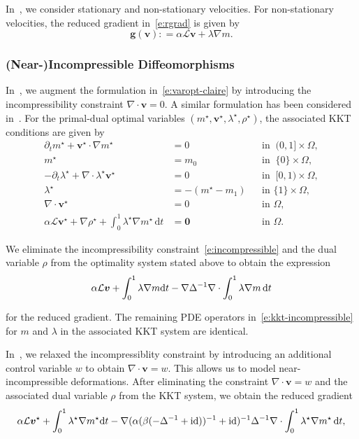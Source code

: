 \documentclass[11pt]{amsart}
\newcommand\op[1]{\ensuremath{\mathcal{#1}}}
\newcommand\igrad{\ensuremath{\nabla}}
\newcommand{\idiv}{\ensuremath{\nabla\cdot}}
\newcommand{\ilap}{\rotatebox[origin=c]{180}{$\nabla$}}
\newcommand{\defeq}{\ensuremath{\mathrel{\mathop:}=}}
\renewcommand{\d}{\ensuremath{\text{d}}}
\renewcommand{\vec}[1]{\ensuremath{\boldsymbol{#1}}}
\begin{document}
In~\cite{Mang:2015a}, we consider stationary and non-stationary velocities. For non-stationary velocities, the reduced gradient in~\eqref{e:rgrad} is given by
\[
\vec{g}(\vec{v}) \defeq
\alpha \op{L} \vec{v} + \lambda \igrad m.
\]




\subsubsection*{(Near-)Incompressible Diffeomorphisms}

In~\cite{Mang:2015a}, we augment the formulation in~\eqref{e:varopt-claire} by introducing the incompressibility constraint $\idiv \vec{v} = 0$. A similar formulation has been considered in~\cite{Chen:2012a}. For the primal-dual optimal variables $(m^\star, \vec{v}^\star, \lambda^\star, \rho^\star)$, the associated KKT conditions are given by
\begin{subequations}\label{e:kkt-incompressible}
\begin{align}
\partial_t m^\star + \vec{v}^\star \cdot \igrad m^\star & = 0
&& \text{in}\;\; (0,1] \times \Omega,
\\
m^\star &= m_0
&& \text{in}\;\; \{0\} \times \Omega,
\\
-\partial_t \lambda^\star + \idiv \lambda^\star\vec{v}^\star  & = 0
&& \text{in}\;\; [0,1) \times \Omega,
\\
\lambda^\star &=  -(m^\star - m_1)
&& \text{in}\,\,\{1\} \times \Omega,
\\
\idiv \vec{v}^\star &= 0
&& \text{in}\,\,\Omega,\label{e:incompressible}
\\
\alpha \op{L} \vec{v}^\star + \igrad  \rho^\star + \int_0^1\lambda^\star \igrad m^\star\, \d t &= \vec{0}
&& \text{in}\,\,\Omega.
\end{align}
\end{subequations}

We eliminate the incompressibility constraint~\eqref{e:incompressible} and the dual variable $\rho$ from the optimality system stated above to obtain the expression
\[
\alpha \op{L} \vec{v}
+ \int_0^1\lambda \igrad m \d t
- \igrad \ilap^{-1} \idiv \int_0^1\lambda \igrad m\, \d t
\]

\noindent for the reduced gradient. The remaining PDE operators in~\eqref{e:kkt-incompressible} for $m$ and $\lambda$ in the associated KKT system are identical.

In~\cite{Mang:2016a}, we relaxed the incompressiblity constraint by introducing an additional control variable $w$ to obtain $\idiv \vec{v} = w$. This allows us to model near-incompressible deformations. After eliminating the constraint $\idiv \vec{v} = w$ and the associated dual variable $\rho$ from the KKT system, we obtain the reduced gradient
\[
\alpha \op{L} \vec{v}^\star
+ \int_0^1\lambda^\star \igrad m^\star \d t
- \igrad (\alpha(\beta (-\ilap^{-1} + \operatorname{id}))^{-1} + \operatorname{id})^{-1} \ilap^{-1} \idiv \int_0^1\lambda^\star \igrad m^\star\, \d t,
\]
\end{document}
